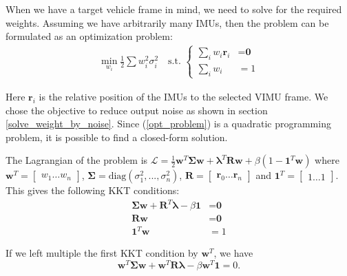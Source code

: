 \documentclass[conference]{IEEEtran}
\begin{document}
When we have a target vehicle frame in mind, we need to solve for the required weights. Assuming we have arbitrarily many IMUs, then the problem can be formulated as an optimization problem:
\begin{equation}\label{opt_problem}
\begin{split}
    \min_{w_i}{\frac{1}{2} \sum{w_i^2 \sigma_i^2}} \quad \text{s.t. }
    \begin{cases}
      \sum_i{w_i \textbf{r}_i} &= \textbf{0} \\
      \sum_i{w_i} &= 1
    \end{cases}
\end{split}
\end{equation}

\noindent Here $\textbf{r}_i$ is the relative position of the IMUs to the selected VIMU frame. We chose the objective to reduce output noise as shown in section \ref{solve_weight_by_noise}. Since (\ref{opt_problem}) is a quadratic programming problem, it is possible to find a closed-form solution.

The Lagrangian of the problem is $\mathcal{L} = \frac{1}{2}\textbf{w}^T \bm{\Sigma} \textbf{w} + \bm{\lambda}^T \textbf{R}\textbf{w} + \beta \left( 1 - \textbf{1}^T \textbf{w} \right)$ where $\textbf{w}^T = \left[\begin{matrix} w_1 \dots w_n \end{matrix}\right]$, $\bm{\Sigma} = \text{diag}(\sigma_1^2, ..., \sigma_n^2)$, $\textbf{R} = \left[\begin{matrix} \textbf{r}_0 \dots \textbf{r}_n\end{matrix}\right]$ and $\textbf{1}^T = \left[\begin{matrix}1 \dots 1\end{matrix}\right]$. This gives the following KKT conditions:
\begin{equation}
\begin{split}
  \bm{\Sigma}\textbf{w} + \textbf{R}^T \bm{\lambda} - \beta \textbf{1} &= \textbf{0} \\
  \textbf{R} \textbf{w} &= \textbf{0} \\
  \textbf{1}^T \textbf{w} &= 1
\end{split}
\end{equation}

\noindent If we left multiple the first KKT condition by $\textbf{w}^T$, we have
\begin{equation}
\textbf{w}^T\bm{\Sigma}\textbf{w} + \textbf{w}^T\textbf{R}\bm{\lambda} - \beta \textbf{w}^T\textbf{1} = 0.
\end{equation}
\end{document}
